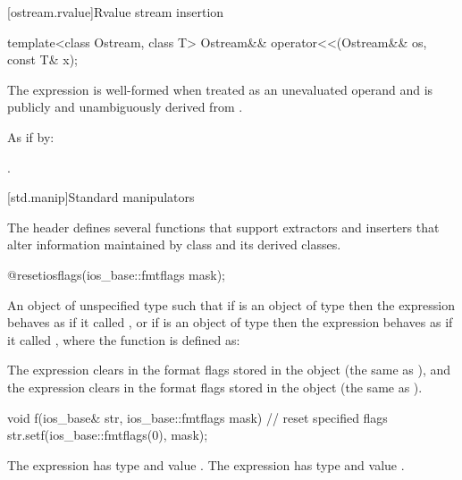 [ostream.rvalue]{Rvalue stream insertion}

%
\begin{itemdecl}
template<class Ostream, class T>
  Ostream&& operator<<(Ostream&& os, const T& x);
\end{itemdecl}

\begin{itemdescr}
\pnum
\constraints
The expression  is well-formed
when treated as an unevaluated operand and
 is publicly and unambiguously derived from .

\pnum
\effects
As if by: 

\pnum
\returns
{}.
\end{itemdescr}


[std.manip]{Standard manipulators}

\pnum
The header  defines several functions that support
extractors and inserters that alter information maintained by class
 and its derived classes.

%
\begin{itemdecl}
@\unspec@ resetiosflags(ios_base::fmtflags mask);
\end{itemdecl}

\begin{itemdescr}
\pnum
\returns
An object of
unspecified type such that if  is an object of type
 then the expression
 behaves as if it called
, or if  is an object of type
 then the expression
 behaves as if it called
, where the function 
is defined as:
\begin{footnote}
 The expression 
clears  in the format flags stored in the
 object  (the same as
), and the expression
 clears  in the
format flags stored in the  object
 (the same as ).
\end{footnote}

\begin{codeblock}
void f(ios_base& str, ios_base::fmtflags mask) {
  // reset specified flags
  str.setf(ios_base::fmtflags(0), mask);
}
\end{codeblock}

The expression  has
type  and value . The
expression  has type
 and value .
\end{itemdescr}

